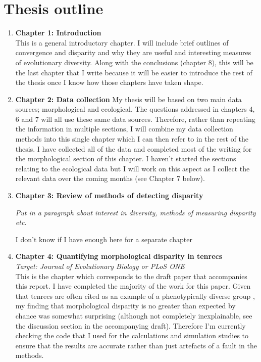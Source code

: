 \documentclass[12pt,a4paper]{article}
\begin{document}
\section{Thesis outline}
\begin{enumerate}
\item \textbf{Chapter 1: Introduction}\\

This is a general introductory chapter. I will include brief outlines of convergence and disparity and why they are useful and interesting measures of evolutionary diversity.
Along with the conclusions (chapter 8), this will be the last chapter that I write because it will be easier to introduce the rest of the thesis once I know how those chapters have taken shape. 

\item \textbf{Chapter 2: Data collection}
My thesis will be based on two main data sources; morphological and ecological. The questions addressed in chapters 4, 6 and 7 will all use these same data sources. Therefore, rather than repeating the information in multiple sections, I will combine my data collection methods into this single chapter which I can then refer to in the rest of the thesis. 
I have collected all of the data and completed most of the writing for the morphological section of this chapter. I haven't started the sections relating to the ecological data but I will work on this aspect as I collect the relevant data over the coming months (see Chapter 7 below).


\item \textbf{Chapter 3: Review of methods of detecting disparity}

\textit{Put in a paragraph about interest in diversity, methods of measuring disparity etc.}

I don't know if I have enough here for a separate chapter


\item \textbf{Chapter 4: Quantifying morphological disparity in tenrecs}\\
\textit{Target: Journal of Evolutionary Biology or PLoS ONE}\\
This is the chapter which corresponds to the draft paper that accompanies this report. I have completed the majority of the work for this paper. Given that tenrecs are often cited as an example of a phenotypically diverse group \citep[e.g.][]{Olson2013}, my finding that morphological disparity is no greater than expected by chance was somewhat surprising (although not completely inexplainable, see the discussion section in the accompanying draft). Therefore I'm currently checking the code that I used for the calculations and simulation studies to ensure that the results are accurate rather than just artefacts of a fault in the methods. 


\end{enumerate}
\end{document}
